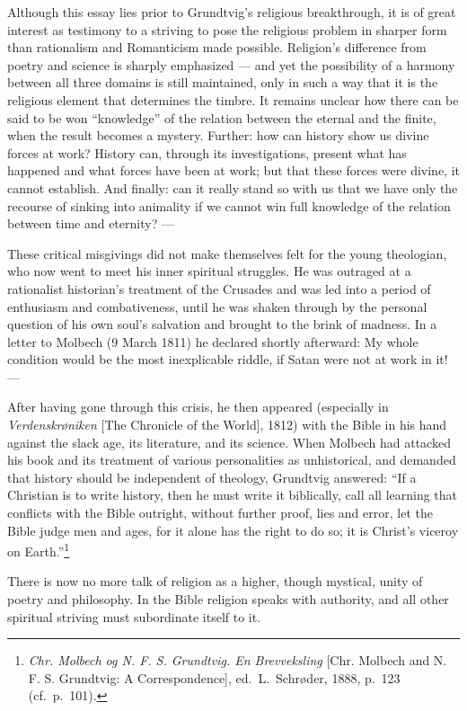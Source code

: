 \documentclass[12pt,a4paper]{book}
\newcommand{\opage}[1]{\marginnote{\footnotesize\textit{[#1]}}}
\begin{document}
Although this essay lies prior to Grundtvig's religious breakthrough, it is of great
interest as testimony to a striving to pose the religious problem in sharper \opage{60}form than
rationalism and Romanticism made possible. Religion's difference from poetry and
science is sharply emphasized --- and yet the possibility of a harmony between all
three domains is still maintained, only in such a way that it is the religious element
that determines the timbre. It remains unclear how there can be said to be won
``knowledge'' of the relation between the eternal and the finite, when the result
becomes a mystery. Further: how can history show us divine forces at work? History
can, through its investigations, present what has happened and what forces have been at
work; but that these forces were divine, it cannot establish. And finally: can it
really stand so with us that we have only the recourse of sinking into animality if we
cannot win full knowledge of the relation between time and eternity? ---

These critical misgivings did not make themselves felt for the young theologian, who
now went to meet his inner spiritual struggles. He was outraged at a rationalist
historian's treatment of the Crusades and was led into a period of enthusiasm and
combativeness, until he was shaken through by the personal question of his own soul's
salvation and brought to the brink of madness. In a letter to Molbech (9 March 1811)
he declared shortly afterward: My whole condition would be the most inexplicable
riddle, if Satan were not at work in it! ---

After having gone through this crisis, he then appeared (especially in
\emph{Verdenskrøniken} [The Chronicle of the World], 1812) with the Bible in his hand
against the slack age, its literature, and its science. When Molbech had attacked his
book and its treatment of various personalities as unhistorical, and demanded that
history should be independent of theology, Grundtvig answered: ``If a Christian is to
write history, then he must write it biblically, call all learning that conflicts with
the Bible outright, without further proof, lies and error, let the Bible judge men and
ages, for it alone has the right to do so; it is Christ's viceroy on
Earth.''\footnote{\emph{Chr. Molbech og N. F. S. Grundtvig. En Brevveksling} [Chr.
Molbech and N. F. S. Grundtvig: A Correspondence], ed.\ L.\ Schrøder, 1888, p.~123
(cf.\ p.~101).}

\opage{61}There is now no more talk of religion as a higher, though mystical, unity of poetry
and philosophy. In the Bible religion speaks with authority, and all other spiritual
striving must subordinate itself to it.
\end{document}
